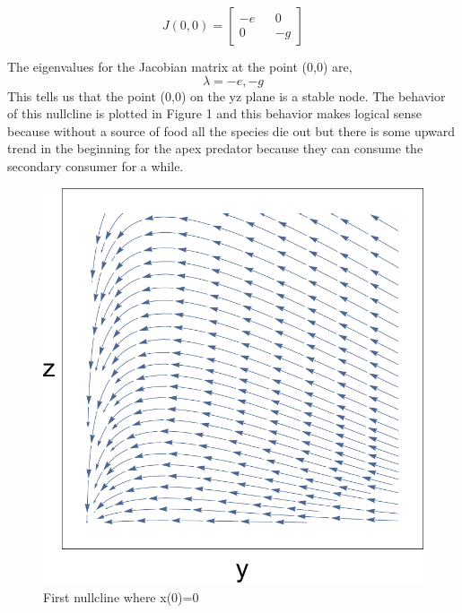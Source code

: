 \documentclass[11pt,oneside]{article}
\begin{document}
	\begin{equation}
	J(0,0) = 
	\begin{bmatrix}
	-e && 0 \\
	0 && -g
	\end{bmatrix}
	\end{equation}
	
	The eigenvalues for the Jacobian matrix at the point (0,0) are,
	\[\lambda = -e,-g\]
	This tells us that the point (0,0) on the yz plane is a stable node. The behavior of this nullcline is plotted in Figure 1 and this behavior makes logical sense because without a source of food all the species die out but there is some upward trend in the beginning for the apex predator because they can consume the secondary consumer for a while.
	\begin{figure}[H]
		\center
		\includegraphics[scale=0.5]{YZ}
		\caption{First nullcline where x(0)=0}
	\end{figure}
	
\end{document}
